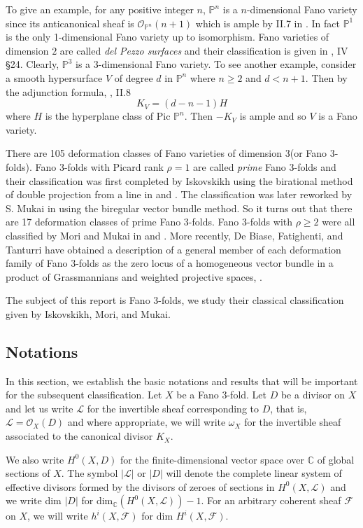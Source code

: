 \documentclass[11pt]{amsart}
\theoremstyle{plain}
\theoremstyle{definition}
\theoremstyle{expl}
\begin{document}
	To give an example, for any positive integer $n$,  $\mathbb{P}^n$ is a $n$-dimensional Fano variety since its anticanonical sheaf is $\mathcal{O}_{\mathbb{P}^n}(n+1)$ which is ample by II.7 in \cite{Hartshorne}. In fact $\mathbb{P}^1$ is the only 1-dimensional Fano variety up to isomorphism. Fano varieties of dimension $2$ are called \textit{del Pezzo surfaces} and their classification is given in \cite{Manin}, IV \S 24. Clearly, $\mathbb{P}^3$ is a $3$-dimensional Fano variety. To see another example, consider a smooth hypersurface $V$ of degree $d$ in $\mathbb{P}^n$ where $n \geq 2$ and $d<n+1$. Then by the adjunction formula, \cite{Hartshorne}, II.8
	\[
	K_V = (d-n-1)H
	\]
    where $H$ is the hyperplane class of Pic $\mathbb{P}^n$. Then $-K_V$ is ample and so $V$ is a Fano variety.
    
 There are 105 deformation classes of Fano varieties of dimension $3$(or Fano $3$-folds). Fano $3$-folds with Picard rank $\rho =1$ are called \textit{prime} Fano $3$-folds and their classification was first completed by Iskovskikh using the birational method of double projection from a line in \cite{Isk77} and \cite{Isk78}. The classification was later reworked by S. Mukai in \cite{Muk89} using the biregular vector bundle method. So it turns out that there are 17 deformation classes of prime Fano $3$-folds. Fano $3$-folds with $\rho\geq 2$ were all classified by Mori and Mukai in \cite{MM81} and \cite{MM03}. More recently, De Biase, Fatighenti, and Tanturri have obtained a description of a general member of each deformation family of Fano $3$-folds as the zero locus of a homogeneous vector bundle in a product of Grassmannians and weighted projective spaces, \cite{Hove}.
 
The subject of this report is Fano $3$-folds, we study their classical classification given by Iskovskikh, Mori, and Mukai. 

\subsection{Notations} In this section, we establish the basic notations and results that will be important for the subsequent classification. 
Let $X$ be a Fano $3$-fold. 
Let $D$ be a divisor on $X$ and let us write $\mathcal{L}$ for the invertible sheaf corresponding to $D$, that is, $\mathcal{L} = \mathcal{O}_X(D)$ and where appropriate, we will write $\omega_X$ for the invertible sheaf associated to the canonical divisor $K_X$.

We also write $H^0(X,D)$ for the finite-dimensional vector space over $\mathbb{C}$ of global sections of $X$.
The symbol $|\mathcal{L}|$ or $|D|$ will denote the complete linear system of effective divisors formed by the divisors of zeroes of sections in $H^0(X,\mathcal{L})$ and we write dim $|D|$ for dim$_{\mathbb{C}}(H^0(X,\mathcal{L})) -1$.
For an arbitrary coherent sheaf $\mathcal{F}$ on $X$, we will write $h^i(X,\mathcal{F})$ for dim $H^i(X,\mathcal{F})$. 
\end{document}

